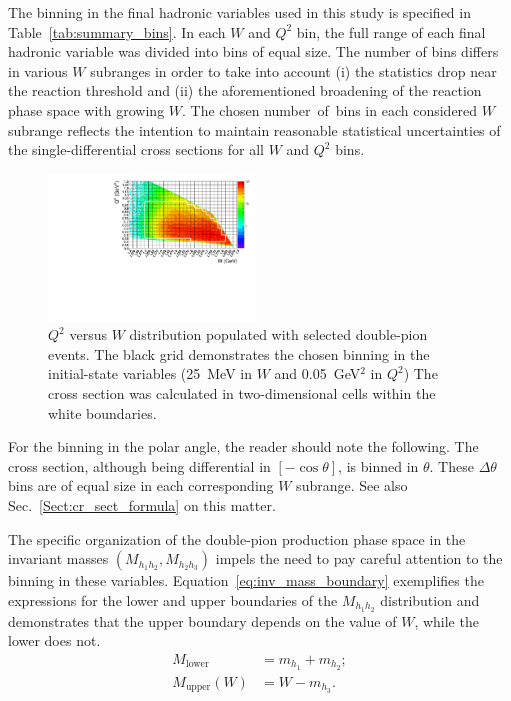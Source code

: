 \documentclass[prc,twocolumn,superscriptaddress,showpacs,amssymb,amsmath,amsfonts,aps,nofootinbib]{revtex4-1}
\begin{document}
The binning in the final hadronic variables used in this study is specified in Table~\ref{tab:summary_bins}. In each $W$ and $Q^{2}$ bin, the full range of each final hadronic variable was divided into bins of equal size. The number of bins differs in various $W$ subranges in order to take into account (i) the statistics drop near the reaction threshold and (ii) the aforementioned broadening of the reaction phase space with growing $W$. The chosen number~of~bins in each considered $W$ subrange reflects the intention to maintain reasonable statistical uncertainties of the single-differential cross sections for all $W$ and $Q^2$ bins. 

\begin{figure}[htp]
\begin{center}
\includegraphics[width=0.49\textwidth]{pictures/q2vsw_new2.pdf}
\caption{\small $Q^2$ versus $W$ distribution populated with selected double-pion events. The black grid demonstrates the chosen binning in the initial-state variables (25~MeV in $W$ and 0.05~GeV$^{2}$ in $Q^{2}$) The cross section was calculated in two-dimensional cells within the white boundaries.} \label{fig:q2_vs_w}
\end{center}
\end{figure}


For the binning in the polar angle, the reader should note the following. The cross section, although being differential in $[-\cos\theta]$, is binned in $\theta$. These $\Delta \theta$ bins are of equal size in each corresponding $W$ subrange. See also Sec.\!~\ref{Sect:cr_sect_formula} on this matter.


The specific organization of the double-pion production phase space in the invariant masses $(M_{h_{1}h_{2}}, M_{h_{2}h_{3}})$ impels the need to pay careful attention to the binning in these variables. Equation~\eqref{eq:inv_mass_boundary} exemplifies the expressions for the lower and upper boundaries of the $M_{h_{1}h_{2}}$ distribution and demonstrates that the upper boundary depends on the value of $W$, while the lower does not.
\begin{equation}
\begin{aligned}
M_{\text{lower}} &= m_{h_1} + m_{h_2}; \\
M_{\text{upper}} (W) &= W - m_{h_3}. \label{eq:inv_mass_boundary}
\end{aligned}  
\end{equation}
\end{document}
